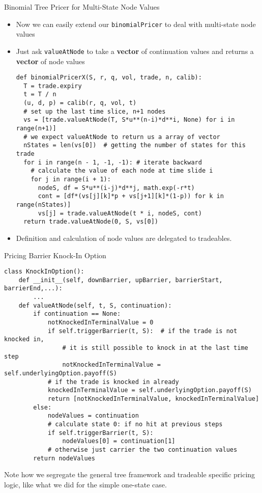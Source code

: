 \begin{frame}[fragile]{Binomial Tree Pricer for Multi-State Node Values}
\begin{itemize}
\item Now we can easily extend our \verb_binomialPricer_ to deal with multi-state node values
\item Just ask \verb_valueAtNode_ to take a \textbf{vector} of continuation values and returns a \textbf{vector} of node values
\begin{lstlisting}
def binomialPricerX(S, r, q, vol, trade, n, calib):
  T = trade.expiry
  t = T / n
  (u, d, p) = calib(r, q, vol, t)
  # set up the last time slice, n+1 nodes
  vs = [trade.valueAtNode(T, S*u**(n-i)*d**i, None) for i in range(n+1)]
  # we expect valueAtNode to return us a array of vector
  nStates = len(vs[0])  # getting the number of states for this trade
  for i in range(n - 1, -1, -1): # iterate backward
    # calculate the value of each node at time slide i
    for j in range(i + 1):
      nodeS, df = S*u**(i-j)*d**j, math.exp(-r*t)
      cont = [df*(vs[j][k]*p + vs[j+1][k]*(1-p)) for k in range(nStates)]
      vs[j] = trade.valueAtNode(t * i, nodeS, cont)
  return trade.valueAtNode(0, S, vs[0])
\end{lstlisting}
\item Definition and calculation of node values are delegated to tradeables.
\end{itemize}
\end{frame}

\begin{frame}[fragile]{Pricing Barrier Knock-In Option}
\begin{lstlisting}
class KnockInOption():
    def __init__(self, downBarrier, upBarrier, barrierStart, barrierEnd,...):
        ...
    def valueAtNode(self, t, S, continuation):
        if continuation == None:
            notKnockedInTerminalValue = 0
            if self.triggerBarrier(t, S):  # if the trade is not knocked in,
                # it is still possible to knock in at the last time step
                notKnockedInTerminalValue = self.underlyingOption.payoff(S)
            # if the trade is knocked in already
            knockedInTerminalValue = self.underlyingOption.payoff(S)
            return [notKnockedInTerminalValue, knockedInTerminalValue]
        else:
            nodeValues = continuation
            # calculate state 0: if no hit at previous steps
            if self.triggerBarrier(t, S):
                nodeValues[0] = continuation[1]
            # otherwise just carrier the two continuation values
        return nodeValues
\end{lstlisting}
Note how we segregate the general tree framework and tradeable specific pricing logic, like what we did for the simple one-state case.
\end{frame}

